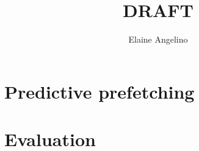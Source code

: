 \documentclass[11pt]{article}
\begin{document}
\title{DRAFT}
\author{Elaine Angelino}

\maketitle

\begin{abstract}

\end{abstract}

\newpage

\section{Predictive prefetching}
\label{sec:prefetching}


\section{Evaluation}
\label{sec:evaluation}





\newpage
\appendix 
\end{document}
